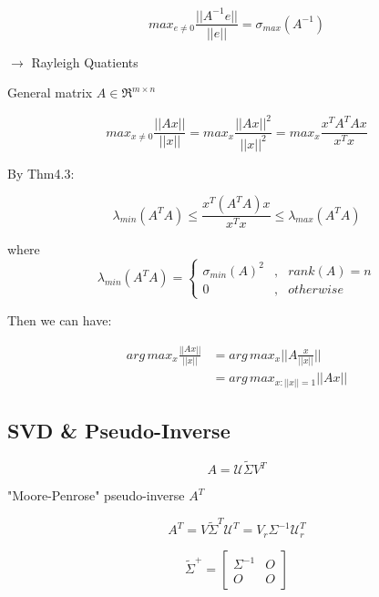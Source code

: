 \begin{equation*}
max_{e\neq 0} \frac{||A^{-1}e||}{||e||} =\sigma_{max}(A^{-1})
\end{equation*}

$\rightarrow$ Rayleigh Quatients

General matrix $A\in \Re^{m\times n}$

\begin{equation*}
max_{x\neq 0} \frac{||Ax||}{||x||} = max_x\frac{||Ax||^2}{||x||^2} = max_x\frac{x^TA^TAx}{x^Tx}
\end{equation*}

By Thm4.3: 

\begin{equation*}
\lambda_{min}(A^TA)\leq \frac{x^T(A^TA)x}{x^Tx}\leq \lambda_{max}(A^TA)
\end{equation*}

where 
\begin{equation}
\label{eq6}
\lambda_{min}(A^TA)=\left\{
\begin{aligned}
\sigma_{min}(A)^2 & , & rank(A) = n \\
0 & , & otherwise
\end{aligned}
\right.
\end{equation}

Then we can have:

\begin{align*}
arg\, max_x\frac{||Ax||}{||x||} &= arg\, max_x||A\frac{x}{||x||}||\\
&= arg\, max_{x: ||x|| = 1}||Ax||
\end{align*}

\subsection{SVD \& Pseudo-Inverse}
\begin{equation*}
A = \mathcal{U}\tilde{\Sigma}V^T
\end{equation*}

"Moore-Penrose" pseudo-inverse $A^T$

\begin{equation*}
A^T = V\tilde{\Sigma}^T\mathcal{U}^T = V_r\Sigma^{-1}\mathcal{U}_r^T
\end{equation*}


$$ \tilde{\Sigma}^+ =   
\left[
\begin{matrix}
\Sigma^{-1} & O\\
O & O
\end{matrix}
\right]
$$


